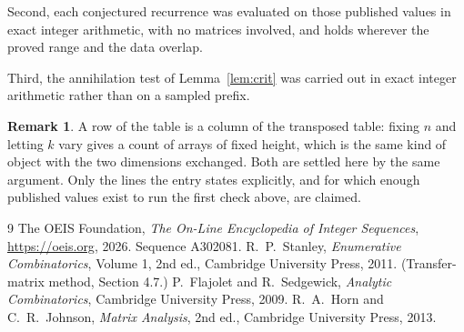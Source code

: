 \documentclass[11pt,a4paper]{article}
\theoremstyle{plain}
\theoremstyle{definition}
\newtheorem{remark}[theorem]{Remark}
\begin{document}
Second, each conjectured recurrence was evaluated on those published values in exact
integer arithmetic, with no matrices involved, and holds wherever the proved range and the
data overlap.

Third, the annihilation test of Lemma~\ref{lem:crit} was carried out in exact integer
arithmetic rather than on a sampled prefix.

\begin{remark}
A row of the table is a column of the transposed table: fixing $n$ and letting $k$ vary gives a
count of arrays of fixed height, which is the same kind of object with the two dimensions
exchanged. Both are settled here by the same argument. Only the lines the entry states
explicitly, and for which enough published values exist to run the first check above, are
claimed.
\end{remark}

\begin{thebibliography}{9}
 The OEIS Foundation, \emph{The On-Line Encyclopedia of Integer
Sequences}, \url{https://oeis.org}, 2026. Sequence A302081.
 R.~P.~Stanley, \emph{Enumerative Combinatorics}, Volume 1, 2nd ed.,
Cambridge University Press, 2011. (Transfer-matrix method, Section 4.7.)
 P.~Flajolet and R.~Sedgewick, \emph{Analytic Combinatorics}, Cambridge
University Press, 2009.
 R.~A.~Horn and C.~R.~Johnson, \emph{Matrix Analysis}, 2nd ed., Cambridge
University Press, 2013.
\end{thebibliography}
\end{document}
